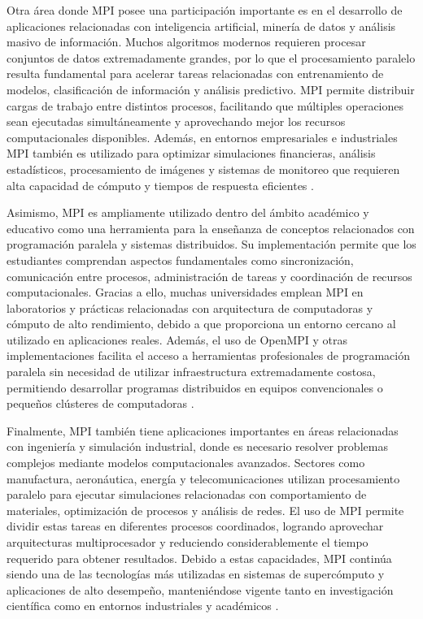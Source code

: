 Otra área donde MPI posee una participación importante es en el desarrollo de aplicaciones relacionadas con inteligencia artificial, minería de datos y análisis masivo de información. Muchos algoritmos modernos requieren procesar conjuntos de datos extremadamente grandes, por lo que el procesamiento paralelo resulta fundamental para acelerar tareas relacionadas con entrenamiento de modelos, clasificación de información y análisis predictivo. MPI permite distribuir cargas de trabajo entre distintos procesos, facilitando que múltiples operaciones sean ejecutadas simultáneamente y aprovechando mejor los recursos computacionales disponibles. Además, en entornos empresariales e industriales MPI también es utilizado para optimizar simulaciones financieras, análisis estadísticos, procesamiento de imágenes y sistemas de monitoreo que requieren alta capacidad de cómputo y tiempos de respuesta eficientes \cite{ref2_frem,ref5_frem}.

Asimismo, MPI es ampliamente utilizado dentro del ámbito académico y educativo como una herramienta para la enseñanza de conceptos relacionados con programación paralela y sistemas distribuidos. Su implementación permite que los estudiantes comprendan aspectos fundamentales como sincronización, comunicación entre procesos, administración de tareas y coordinación de recursos computacionales. Gracias a ello, muchas universidades emplean MPI en laboratorios y prácticas relacionadas con arquitectura de computadoras y cómputo de alto rendimiento, debido a que proporciona un entorno cercano al utilizado en aplicaciones reales. Además, el uso de OpenMPI y otras implementaciones facilita el acceso a herramientas profesionales de programación paralela sin necesidad de utilizar infraestructura extremadamente costosa, permitiendo desarrollar programas distribuidos en equipos convencionales o pequeños clústeres de computadoras \cite{ref7_frem,ref9_frem}.

Finalmente, MPI también tiene aplicaciones importantes en áreas relacionadas con ingeniería y simulación industrial, donde es necesario resolver problemas complejos mediante modelos computacionales avanzados. Sectores como manufactura, aeronáutica, energía y telecomunicaciones utilizan procesamiento paralelo para ejecutar simulaciones relacionadas con comportamiento de materiales, optimización de procesos y análisis de redes. El uso de MPI permite dividir estas tareas en diferentes procesos coordinados, logrando aprovechar arquitecturas multiprocesador y reduciendo considerablemente el tiempo requerido para obtener resultados. Debido a estas capacidades, MPI continúa siendo una de las tecnologías más utilizadas en sistemas de supercómputo y aplicaciones de alto desempeño, manteniéndose vigente tanto en investigación científica como en entornos industriales y académicos \cite{ref3_frem,ref6_frem}.
